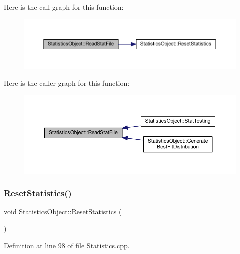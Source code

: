 Here is the call graph for this function\+:
\nopagebreak
\begin{figure}[H]
\begin{center}
\leavevmode
\includegraphics[width=350pt]{class_statistics_object_a693fe5171d536953cc5545048716dcca_cgraph}
\end{center}
\end{figure}
Here is the caller graph for this function\+:
\nopagebreak
\begin{figure}[H]
\begin{center}
\leavevmode
\includegraphics[width=350pt]{class_statistics_object_a693fe5171d536953cc5545048716dcca_icgraph}
\end{center}
\end{figure}
\mbox{\label{class_statistics_object_aafceb8d5caaffc3482e5f9be760fc953}} 
\subsubsection{\texorpdfstring{Reset\+Statistics()}{ResetStatistics()}}
{\footnotesize\ttfamily void Statistics\+Object\+::\+Reset\+Statistics (\begin{DoxyParamCaption}{ }\end{DoxyParamCaption})}



Definition at line 98 of file Statistics.\+cpp.

